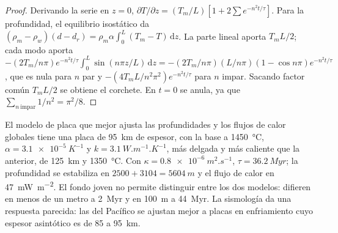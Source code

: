 \begin{proof}
Derivando la serie en $z = 0$, $\partial T/\partial z = (T_m/L)[1 +
2\sum e^{-n^2t/\tau}]$. Para la profundidad, el equilibrio isostático da $(\rho_m -
\rho_w)(d - d_r) = \rho_m\alpha\int_0^L(T_m - T)\,\mathrm dz$. La parte lineal
aporta $T_mL/2$; cada modo aporta $-(2T_m/n\pi)e^{-n^2t/\tau}
\int_0^L\sin(n\pi z/L)\,\mathrm dz = -(2T_m/n\pi)(L/n\pi)(1 - \cos n\pi)
e^{-n^2t/\tau}$, que es nula para $n$ par y $-(4T_mL/n^2\pi^2)
e^{-n^2t/\tau}$ para $n$ impar. Sacando factor común $T_mL/2$ se obtiene el corchete. En $t = 0$
se anula, ya que $\sum_{n\ \text{impar}}1/n^2 = \pi^2/8$.
\end{proof}

El modelo de placa que mejor ajusta las profundidades y los flujos de calor globales tiene una placa
de \qty{95}{km} de espesor, con la base a \qty{1450}{\celsius}, $\alpha =
\qty{3.1e-5}{K^{-1}}$ y $k = \qty{3.1}{W.m^{-1}.K^{-1}}$, más delgada y más caliente
que la anterior, de \qty{125}{km} y \qty{1350}{\celsius}. Con $\kappa =
\qty{0.8e-6}{m^2.s^{-1}}$, $\tau = \qty{36.2}{Myr}$; la profundidad se estabiliza en
$2500 + 3104 = \qty{5604}{m}$ y el flujo de calor en \qty{47}{mW.m^{-2}}. El fondo
joven no permite distinguir entre los dos modelos: difieren en menos de un metro a
\qty{2}{Myr} y en \qty{100}{m} a \qty{44}{Myr}. La sismología da una respuesta
parecida: las  del Pacífico se ajustan mejor a placas en enfriamiento cuyo
espesor asintótico es de 85 a \qty{95}{km}.

